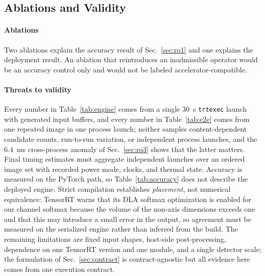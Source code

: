 \subsection{Ablations and Validity}
\label{sec:validity}

\paragraph*{Ablations}
Two ablations explain the accuracy result of Sec.~\ref{sec:rq1} and one explains
the deployment result.  An ablation that reintroduces
an inadmissible operator would be an accuracy control only and would not be
labeled accelerator-compatible.

\paragraph*{Threats to validity}
Every number in Table~\ref{tab:engine} comes from a single 30~s
\texttt{trtexec} launch with generated input buffers, and every number in
Table~\ref{tab:e2e} comes from one repeated image in one process launch;
neither samples content-dependent candidate counts, run-to-run variation, or
independent process launches, and the $6.4$~ms cross-process anomaly of
Sec.~\ref{sec:rq3} shows that the latter matters. Final timing estimates must
aggregate independent launches over an ordered image set with recorded power
mode, clocks, and thermal state. Accuracy is measured on the PyTorch path, so
Table~\ref{tab:accuracy} does not describe the deployed engine. Strict
compilation establishes \emph{placement}, not numerical equivalence: TensorRT
warns that its DLA softmax optimization is enabled for our channel softmax
because the volume of the non-axis dimensions exceeds one and that this may
introduce a small error in the output, so agreement must be measured on the
serialized engine rather than inferred from the build. The remaining
limitations are fixed input shapes, host-side post-processing, dependence on one
TensorRT version and one module, and a single detector scale; the formulation of
Sec.~\ref{sec:contract} is contract-agnostic but all evidence here comes from
one execution contract.
